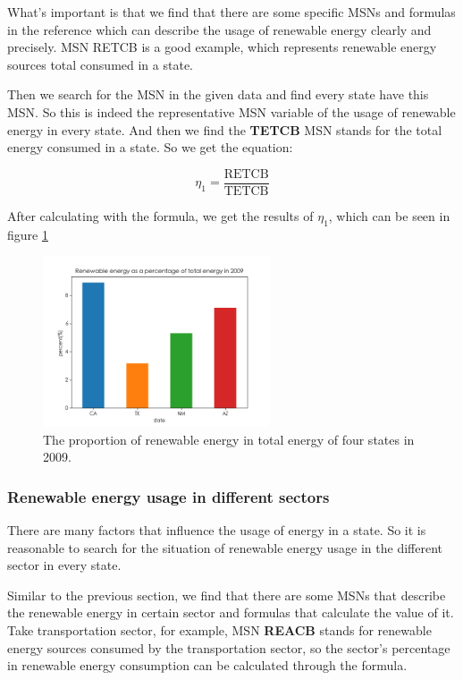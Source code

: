 \documentclass[a4paper,11pt]{article}
\begin{document}
\par What's important is that we find that there are some specific MSNs and formulas in the reference \cite{4} which can describe the usage of renewable energy clearly and precisely. MSN RETCB is a good example, which represents renewable energy sources total consumed in a state.
\par Then we search for the MSN in the given data and find every state have this MSN. 
So this is indeed the representative MSN variable of the usage of renewable energy in every state. And then we find the \textbf{TETCB} MSN stands for the total energy consumed in a state. So we get the equation:

\begin{equation}
    \eta_1=\frac{\text{RETCB}}{\text{TETCB}}
\end{equation}

\par After calculating with the formula, we get the results of $\eta_1$, which can be seen in figure \ref{fig:1-2}

\begin{figure}[H]%
    \centering 
    \includegraphics[width=0.6\textwidth]{./Pic/1-2.png}
    \caption{The proportion of renewable energy in total energy of four states in 2009.}
    \label{fig:1-2}  
\end{figure}
\subsubsection{Renewable energy usage in different sectors}
\par There are many factors that influence the usage of energy in a state. So it is reasonable to search for the situation of renewable energy usage in the different sector in every state.
\par Similar to the previous section, we find that there are some MSNs that describe the renewable energy in certain sector and formulas that calculate the value of it. 
Take transportation sector, for example, MSN \textbf{REACB} stands for renewable energy sources consumed by the transportation sector, so the sector's percentage in renewable energy consumption can be calculated through the formula. 
\end{document}
